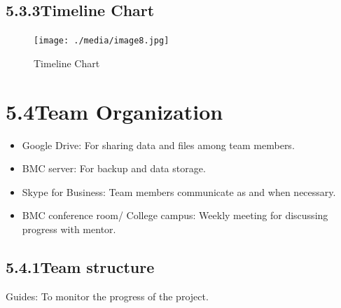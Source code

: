 \documentclass[oneside,a4paper,12pt]{book}
\begin{document}
\subsection*{5.3.3\hspace*{10pt}Timeline Chart}
\begin{Center}



\begin{figure}[H]
	\begin{Center}
		\texttt{[image: ./media/image8.jpg]}
		\caption{Timeline Chart}
		\label{fig:Timeline_Chart}
	\end{Center}
\end{figure}

\end{Center}\par
\newpage
\section*{5.4\hspace*{10pt}Team Organization}
\setlength{\parskip}{0.0pt}
\begin{itemize}
	\item Google Drive: For sharing data and files among team members.\par

	\item BMC server: For backup and data storage.\par

	\item Skype for Business: Team members communicate as and when necessary.\par

	\item BMC conference room/ College campus: Weekly meeting for discussing progress with mentor.
\end{itemize}\par
\setlength{\parskip}{9.96pt}
\subsection*{5.4.1\hspace*{10pt}Team structure}
\tab  Guides: To monitor the progress of the project.\par
\end{document}
